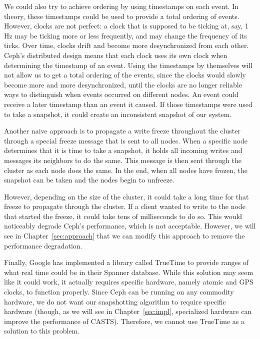 We could also try to achieve ordering by using timestamps on each event. In theory,
these timestamps could be used to provide a total ordering of events. However,
clocks are not perfect: a clock that is supposed to be ticking at, say, 1 Hz 
may be ticking more or less frequently, and may change the frequency of its 
ticks. Over time, clocks drift and become more
desynchronized from each other. Ceph's distributed design means that
each clock uses its own clock when determining the timestamp of an
event. Using the timestamps by themselves will not allow us to get a
total ordering of the events, since the clocks would slowly become
more and more desynchronized, until the clocks are no longer reliable
ways to distinguish when events occurred on different nodes. An event
could receive a later timestamp than an event it caused. If those timestamps 
were used to take a snapshot, it could create an inconsistent snapshot of our 
system.

Another naive approach is to propagate a write freeze throughout the
cluster through a special freeze message that is sent to all nodes.  When a specific node determines that it is time to take a
snapshot, it holds all incoming writes and messages its neighbors to
do the same. This message is then sent through the cluster as each node
does the same. In the end, when all nodes have frozen, the snapshot
can be taken and the nodes begin to unfreeze.

However, depending on the size of the cluster, it could take a long
time for that freeze to propagate through the cluster. If a client
wanted to write to the node that started the freeze, it could take
tens of milliseconds to do so.  This would noticeably degrade Ceph's
performance, which is not acceptable.  However, we will see in
Chapter~\ref{sec:approach} that we can modify this approach to remove
the performance degradation.

Finally, Google has implemented a library called TrueTime to provide
ranges of what real time could be in their Spanner database. While
this solution may seem like it could work, it actually requires
specific hardware, namely atomic and GPS clocks, to function
properly. Since Ceph can be running on any commodity hardware, we do
not want our snapshotting algorithm to require specific hardware (though, as we will
see in Chapter~\ref{sec:impl}, specialized hardware can improve the
performance of CASTS). Therefore, we cannot use TrueTime as a
solution to this problem. 















